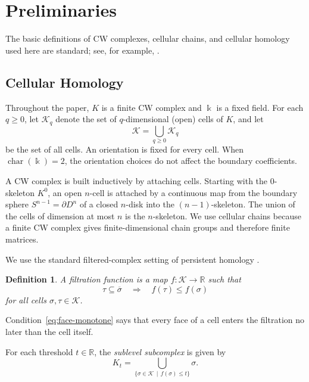 \documentclass[11pt]{article}
\theoremstyle{paperdefinition}
\newtheorem{definition}{Definition}[section]
\theoremstyle{paperplain}
\theoremstyle{paperremark}
\begin{document}
\section{Preliminaries}
\label{sec:preliminaries}

The basic definitions of CW complexes, cellular chains, and cellular homology
used here are standard; see, for example, \cite{hatcher2002algebraic}.

\subsection{Cellular Homology}
\label{subsec:cellular-homology}

Throughout the paper, $K$ is a finite CW complex and $\Bbbk$ is a fixed field. For each $q\geq 0$, let $\mathcal K_q$ denote the set of $q$-dimensional (open) cells of $K$, and let
\[
\mathcal K=\bigcup_{q\geq 0}\mathcal K_q
\]
be the set of all cells. An orientation is fixed for every cell. When $\operatorname{char}(\Bbbk)=2$, the orientation choices do not affect the boundary coefficients.

A CW complex is built inductively by attaching cells. Starting with the $0$-skeleton $K^0$, an open $n$-cell is attached by a continuous map from the boundary sphere $S^{n-1}=\partial D^n$ of a closed $n$-disk into the $(n-1)$-skeleton. The union of the cells of dimension at most $n$ is the $n$-skeleton. We use cellular chains because a finite CW complex gives finite-dimensional chain groups and therefore finite matrices.

We use the standard filtered-complex setting of persistent homology
\cite{edelsbrunner2002topological,zomorodian2005computing,
edelsbrunnerharer2010computational}.

\begin{definition}
\label{def:filtration-function}
A \emph{filtration function} is a map $f:\mathcal K\longrightarrow\mathbb R$ such that
\begin{equation}
\label{eq:face-monotone}
\tau\subseteq\overline{\sigma} \quad\Longrightarrow\quad f(\tau)\leq f(\sigma)
\end{equation}
for all cells $\sigma,\tau\in\mathcal K$.
\end{definition}

Condition~\eqref{eq:face-monotone} says that every face of a cell enters the filtration no later than the cell itself.

For each threshold $t\in\mathbb R$, the \emph{sublevel subcomplex} is given by
\[
K_t = \bigcup_{\{\sigma\in\mathcal K\,\mid\, f(\sigma)\leq t\}}\sigma.
\]
\end{document}
